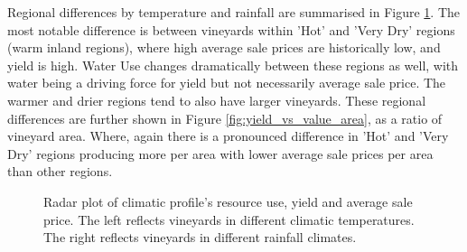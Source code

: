 \documentclass[review,12pt,authoryear]{elsarticle}
\begin{document}
\begin{linenumbers}
%
%
%
%
%
%
%
%
%

Regional differences by temperature and rainfall are summarised in Figure \ref{fig:spider}. The most notable difference is between vineyards within 'Hot' and 'Very Dry' regions (warm inland regions), where high average sale prices are historically low, and yield is high. Water Use changes dramatically between these regions as well, with water being a driving force for yield but not necessarily average sale price. The warmer and drier regions tend to also have larger vineyards. These regional differences are further shown in Figure \ref{fig:yield_vs_value_area}, as a ratio of vineyard area. Where, again there is a pronounced difference in 'Hot' and 'Very Dry' regions producing more per area with lower average sale prices per area than other regions.
\par
\begin{figure}
  \caption{Radar plot of climatic profile's resource use, yield and average sale price. The left reflects vineyards in different climatic temperatures. The right reflects vineyards in different rainfall climates.}\label{fig:spider}
\end{figure}


\end{linenumbers}
\end{document}
